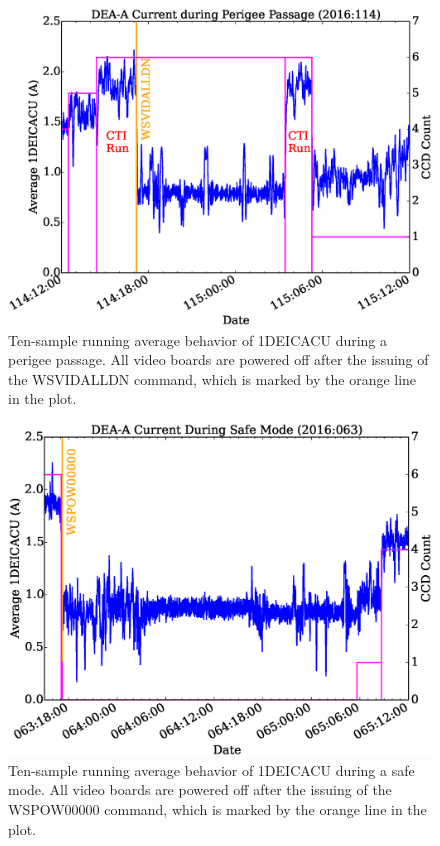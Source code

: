 \documentclass[11pt]{article}
\begin{document}
\begin{landscape}
\begin{figure}
\begin{center}
\includegraphics[width=1.2\textwidth]{deaa_on_fig1.eps}
\caption{Ten-sample running average behavior of 1DEICACU during a perigee passage. All video boards
are powered off after the issuing of the WSVIDALLDN command, which is marked by
the orange line in the plot.}
\end{center}
\end{figure}
\end{landscape}

\begin{landscape}
\begin{figure}
\begin{center}
\includegraphics[width=1.2\textwidth]{deaa_on_fig2.eps}
\caption{Ten-sample running average behavior of 1DEICACU during a safe mode. All video boards
are powered off after the issuing of the WSPOW00000 command, which is marked by
the orange line in the plot.}
\end{center}
\end{figure}
\end{landscape}

\newcommand{\tablecaptiontext}{TURN ON DEA A}

\end{document}
